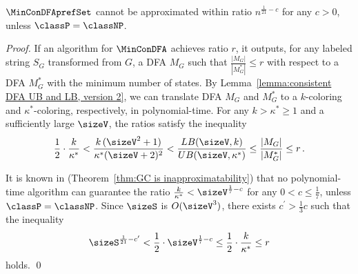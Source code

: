 %


\begin{theorem}\label{theorem:nonapproximability}
 $\MinConDFAprefSet$ cannot be approximated within ratio $n^{\frac{1}{21}-c}$ for any $c >0$, unless $\classP = \classNP$.
\end{theorem}

\begin{proof}
	If an algorithm for $\MinConDFA$ achieves ratio $r$, it outputs, for any labeled string $S_G$ transformed from $G$, a DFA $M_G$ such that $\frac{|M_G|}{|M^*_G|} \leq r$ with respect to a DFA $M^*_G$ with the minimum number of states.
	By Lemma~\ref{lemma:consistent DFA UB and LB, version 2}, we can translate DFA $M_G$ and $M^*_G$ to a $k$-coloring and $\kappa^*$-coloring, respectively, in polynomial-time. 
	For any $k > \kappa^* \geq 1$ and a sufficiently large $\sizeV$, the ratios satisfy the inequality 
	\[
	\frac{1}{2}\cdot\frac{k}{\kappa^*} <
	\frac{k \, ( {\sizeV}^2 +1)}{ \kappa^* (\sizeV+2)^2 } <
	\frac{LB(\sizeV, k)}{UB(\sizeV, \kappa^*)} \leq
	\frac{|M_G|}{|M^*_G|} \leq r \,.
	\]

	It is known in \cite{Bellare-et-al-siamjc98} (Theorem~\ref{thm:GC is inapproximatability}) that no polynomial-time algorithm can guarantee the ratio $\frac{k}{\kappa^*} < \sizeV^{\frac{1}{7} -c}$ for any $0 < c \leq \frac{1}{7}$, unless $\classP=\classNP$. 
Since $\sizeS$ is $O(\sizeV^3)$, there exists $c^\prime > \frac{1}{3}c$ such that  
the inequality 
	\begin{eqnarray*}
	 \sizeS^{\frac{1}{21}-c'} 
	 < \frac{1}{2} \cdot \sizeV^{\frac{1}{7}-c} \leq %
 \frac{1}{2}\cdot\frac{k}{\kappa^*} \leq r 
	\end{eqnarray*}
holds. 
\qed
\end{proof}

